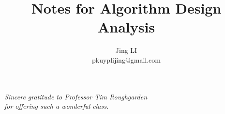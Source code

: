
\def\PREAMBLE{PREAMBLE}
\title{Notes for Algorithm Design Analysis}
\author{Jing LI\\pkuyplijing@gmail.com}


\pagestyle{empty}
\hypersetup{pageanchor=false}
\maketitle
\begin{center}
\emph{Sincere gratitude to Professor Tim Roughgarden \\for offering such a wonderful class.}
\end{center}
\tableofcontents
\newpage
\hypersetup{pageanchor=true}
\pagestyle{headings}



\clearpage%
{}
\listofalgorithms
